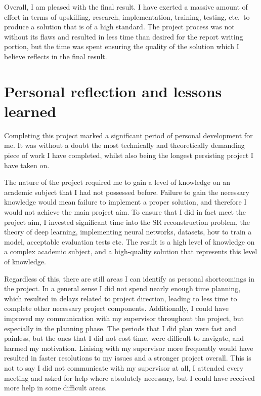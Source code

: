 \begin{appendices}
Overall, I am pleased with the final result. I have exerted a massive amount of effort in terms of upskilling, research, implementation, training, testing, etc.\ to produce a solution that is of a high standard. The project process was not without its flaws and resulted in less time than desired for the report writing portion, but the time was spent ensuring the quality of the solution which I believe reflects in the final result.

\section{Personal reflection and lessons learned}
Completing this project marked a significant period of personal development for me. It was without a doubt the most technically and theoretically demanding piece of work I have completed, whilst also being the longest persisting project I have taken on.

The nature of the project required me to gain a level of knowledge on an academic subject that I had not possessed before. Failure to gain the necessary knowledge would mean failure to implement a proper solution, and therefore I would not achieve the main project aim. To ensure that I did in fact meet the project aim, I invested significant time into the SR reconstruction problem, the theory of deep learning, implementing neural networks, datasets, how to train a model, acceptable evaluation tests etc. The result is a high level of knowledge on a complex academic subject, and a high-quality solution that represents this level of knowledge.

Regardless of this, there are still areas I can identify as personal shortcomings in the project. In a general sense I did not spend nearly enough time planning, which resulted in delays related to project direction, leading to less time to complete other necessary project components. Additionally, I could have improved my communication with my supervisor throughout the project, but especially in the planning phase. The periods that I did plan were fast and painless, but the ones that I did not cost time, were difficult to navigate, and harmed my motivation. Liaising with my supervisor more frequently would have resulted in faster resolutions to my issues and a stronger project overall. This is not to say I did not communicate with my supervisor at all, I attended every meeting and asked for help where absolutely necessary, but I could have received more help in some difficult areas.


\end{appendices}
